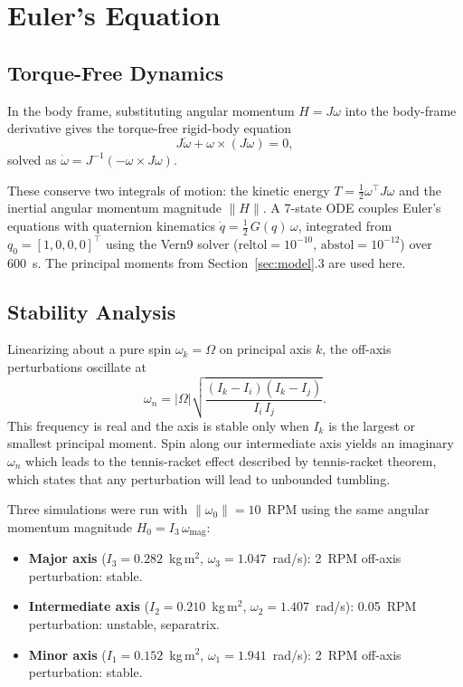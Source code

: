 
\section{Euler's Equation}
\label{sec:euler}

\subsection{Torque-Free Dynamics}

In the body frame, substituting angular momentum $H = J\omega$ into the body-frame derivative gives the torque-free rigid-body equation
\[
J\dot{\omega} + \omega \times (J\omega) = 0,
\]
solved as $\dot{\omega} = J^{-1}(-\omega \times J\omega)$.

These conserve two integrals of motion: the kinetic energy
$T = \tfrac{1}{2}\omega^\top J\omega$
and the inertial angular momentum magnitude $\|H\|$.
A 7-state ODE couples Euler's equations with quaternion kinematics
$\dot{q} = \tfrac{1}{2}\,G(q)\,\omega$,
integrated from $q_0 = [1,0,0,0]^\top$ using the Vern9 solver
($\text{reltol}=10^{-10}$, $\text{abstol}=10^{-12}$) over 600~s.
The principal moments from Section~\ref{sec:model}.3 are used here.

\subsection{Stability Analysis}

Linearizing about a pure spin $\omega_k = \Omega$ on principal axis $k$,
the off-axis perturbations oscillate at
\[
\omega_n = |\Omega|\sqrt{\frac{(I_k - I_i)(I_k - I_j)}{I_i\,I_j}}.
\]
This frequency is real and the axis is stable only when $I_k$
is the largest or smallest principal moment.
Spin along our intermediate axis yields an imaginary $\omega_n$ which leads to  the tennis-racket effect described by tennis-racket theorem, which states that any perturbation will lead to unbounded tumbling.

Three simulations were run with $\|\omega_0\| = 10$~RPM
using the same angular momentum magnitude $H_0 = I_3\,\omega_\mathrm{mag}$:

\begin{itemize}
    \item \textbf{Major axis} ($I_3 = 0.282$~kg\,m$^2$, $\omega_3 = 1.047$~rad/s):
          2~RPM off-axis perturbation: stable.
    \item \textbf{Intermediate axis} ($I_2 = 0.210$~kg\,m$^2$, $\omega_2 = 1.407$~rad/s):
          0.05~RPM perturbation: unstable, separatrix.
    \item \textbf{Minor axis} ($I_1 = 0.152$~kg\,m$^2$, $\omega_1 = 1.941$~rad/s):
          2~RPM off-axis perturbation: stable.
\end{itemize}

